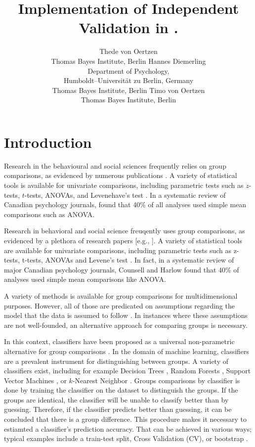 \documentclass[article]{jss}
\author{Thede von Oertzen\\Thomas Bayes Institute, Berlin
   \And Hannes Diemerling\\Department of Psychology,\\Humboldt–Universität zu Berlin, Germany\\Thomas Bayes Institute, Berlin
   \And Timo von Oertzen\\Thomas Bayes Institute, Berlin
}
\title{Implementation of Independent Validation in \proglang{Python}.}
\begin{document}
\section{Introduction} \label{sec:intro}

Research in the behavioural and social sciences frequently relies on group comparisons, as evidenced by numerous publications \citep[e.g.,][]{wee_comparison_2000, weisberg_gender_2011, zhao_comparison_2020}.  A variety of statistical tools is available for univariate comparisons, including parametric tests such as $z$-tests, $t$-tests, ANOVAs, and Levenehave’s test \citep{pearson1900x, student1908probable, fisher1970statistical, levene1960robust}.  In a systematic review of Canadian psychology journals, \citet{counsell_reporting_2017} found that 40\% of all analyses used simple mean comparisons such as ANOVA.

Research in behavioral and social science freuqently uses group comparisons, as evidenced by a plethora of research papers [e.g., \citep{wee_comparison_2000, weisberg_gender_2011, zhao_comparison_2020}].
A variety of statistical tools are available for univariate comparisons, including parametric tests such as z-tests, t-tests, ANOVAs and Levene's test \citep{pearson1900x, student1908probable, fisher1970statistical, levene1960robust}.
In fact, in a systematic review of major Canadian psychology journals, Counsell and Harlow \citep{counsell_reporting_2017} found that 40\% of analyses used simple mean comparisons like ANOVA.

A variety of methods is available for group comparisons for multidimensional purposes.
However, all of those are predicated on assumptions regarding the model that the data is assumed to follow \citep{kim_classifiers_2018}.
In instances where these assumptions are not well-founded, an alternative approach for comparing groups is necessary.

In this context, classifiers \citep{boucheron_theory_2005, bay_detecting_2001} have been proposed as a universal non-parametric alternative for group comparisons \citep{kim_classifiers_2018}.
In the domain of machine learning, classifiers are a prevalent instrument for distinguishing between groups.
A variety of classifiers exist, including for example Decision Trees \citep{breiman_classification_2017}, Random Forests \citep{ho_random_1995}, Support Vector Machines \citep{cortes_support-vector_1995}, or $k$-Nearest Neighbor \citep{cover_nearest_1967}.
Groups comparisons by classifier is done by training the classifier on the dataset to distinguish the groups.
If the groups are identical, the classifier will be unable to classify better than by guessing.
Therefore, if the classifier predicts better than guessing, it can be concluded that there is a group difference.
This procedure makes it necessary to estiamted a classifier's prediction accuracy.
That can be achieved in various ways; typical examples include a train-test split, Cross Validation (CV), or bootstrap \citep{kohavi_study_1995}.
\end{document}
